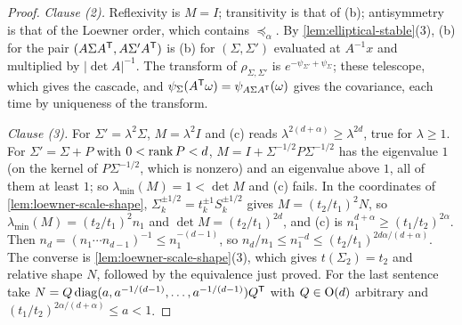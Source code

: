 \begin{proof}
\emph{Clause (2).} Reflexivity is $M = I$; transitivity is that of (b); antisymmetry is that of the
Loewner order, which contains $\preceq_\alpha$. By \ref{lem:elliptical-stable}(3), (b) for the pair
$(A\Sigma A^{\mathsf{T}}, A\Sigma'A^{\mathsf{T}})$ is (b) for $(\Sigma,\Sigma')$ evaluated at $A^{-1}x$ and
multiplied by $|\det A|^{-1}$. The transform of $\rho_{\Sigma,\Sigma'}$ is
$e^{-\psi_{\Sigma'} + \psi_\Sigma}$; these telescope, which gives the cascade, and
$\psi_{\Sigma}(A^{\mathsf{T}}\omega) = \psi_{A\Sigma A^{\mathsf{T}}}(\omega)$ gives the covariance, each time by
uniqueness of the transform.

\emph{Clause (3).} For $\Sigma' = \lambda^2\Sigma$, $M = \lambda^2I$ and (c) reads
$\lambda^{2(d+\alpha)} \ge \lambda^{2d}$, true for $\lambda \ge 1$. For $\Sigma' = \Sigma + P$ with
$0 < \operatorname{rank} P < d$, $M = I + \Sigma^{-1/2}P\Sigma^{-1/2}$ has the eigenvalue $1$ (on the kernel of
$P\Sigma^{-1/2}$, which is nonzero) and an eigenvalue above $1$, all of them at least $1$; so
$\lambda_{\min}(M) = 1 < \det M$ and (c) fails. In the coordinates of \ref{lem:loewner-scale-shape},
$\Sigma_k^{\pm 1/2} = t_k^{\pm1}S_k^{\pm1/2}$ gives $M = (t_2/t_1)^2N$, so
$\lambda_{\min}(M) = (t_2/t_1)^2n_1$ and $\det M = (t_2/t_1)^{2d}$, and (c) is
$n_1^{d+\alpha} \ge (t_1/t_2)^{2\alpha}$. Then $n_d = (n_1\cdots n_{d-1})^{-1} \le
n_1^{-(d-1)}$, so $n_d/n_1 \le n_1^{-d} \le (t_2/t_1)^{2d\alpha/(d+\alpha)}$. The converse is
\ref{lem:loewner-scale-shape}(3), which gives $t(\Sigma_2) = t_2$ and relative shape $N$, followed by
the equivalence just proved. For the last sentence take $N = Q\operatorname{diag}(a, a^{-1/(d-1)}, \dots,
a^{-1/(d-1)})Q^{\mathsf{T}}$ with $Q \in \mathrm{O}(d)$ arbitrary and $(t_1/t_2)^{2\alpha/(d+\alpha)} \le a < 1$.
\end{proof}

